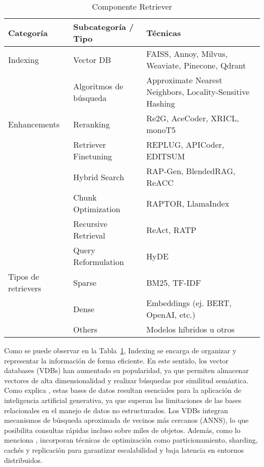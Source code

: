 \begin{table}[H]
\centering
\begin{tabularx}{\textwidth}{l l X}
\toprule
\textbf{Categoría} & \textbf{Subcategoría / Tipo} & \textbf{Técnicas} \\
\midrule
Indexing     & Vector DB               & FAISS, Annoy, Milvus, Weaviate, Pinecone, Qdrant\\
             & Algoritmos de búsqueda  & Approximate Nearest Neighbors, Locality-Sensitive Hashing \\
\midrule
Enhancements & Reranking               & Re2G, AceCoder, XRICL, monoT5\\
             & Retriever Finetuning    & REPLUG, APICoder, EDITSUM \\
             & Hybrid Search           & RAP-Gen, BlendedRAG, ReACC\\
             & Chunk Optimization      & RAPTOR, LlamaIndex  \\
             & Recursive Retrieval     & ReAct, RATP \\
             & Query Reformulation     &  HyDE \\
\midrule
Tipos de retrievers & Sparse            & BM25, TF-IDF \\
                    & Dense             & Embeddings (ej. BERT, OpenAI, etc.) \\
                    & Others            & Modelos híbridos u otros \\
\bottomrule
\end{tabularx}
\caption{Componente Retriever}
\label{tab:retriver}
\end{table}


Como se puede observar en la Tabla~\ref{tab:retriver}, Indexing se encarga de organizar y representar la información de forma eficiente. En este sentido, los vector databases (VDBs) han aumentado su popularidad, ya que permiten almacenar 
vectores de alta dimensionalidad y realizar búsquedas por similitud semántica. Como explica \textcite{joshi2025vector}, estas bases de datos resultan esenciales para 
la aplicación de inteligencia artificial generativa, ya que superan las limitaciones de las bases relacionales en el manejo de datos no estructurados.  
Los VDBs integran mecanismos de búsqueda aproximada de vecinos más cercanos (ANNS), lo que posibilita consultas rápidas incluso sobre miles de objetos. Además, como lo menciona
\textcite{ma2025vector}, incorporan técnicas de optimización como particionamiento, sharding, cachés y replicación para garantizar escalabilidad y baja latencia en entornos distribuidos.  


